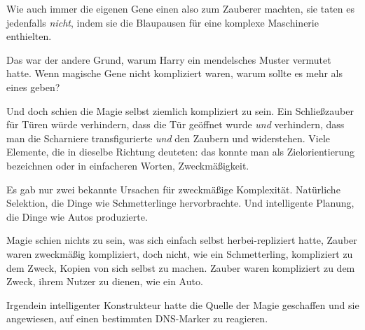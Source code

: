 Wie auch immer die eigenen Gene einen also zum Zauberer machten, sie taten es jedenfalls \emph{nicht}, indem sie die Blaupausen für eine komplexe Maschinerie enthielten.

Das war der andere Grund, warum Harry ein mendelsches Muster vermutet hatte. Wenn magische Gene nicht kompliziert waren, warum sollte es mehr als eines geben?

Und doch schien die Magie selbst ziemlich kompliziert zu sein. Ein Schließzauber für Türen würde verhindern, dass die Tür geöffnet wurde \emph{und} verhindern, dass man die Scharniere transfigurierte \emph{und} den Zaubern  und  widerstehen. Viele Elemente, die in dieselbe Richtung deuteten: das konnte man als Zielorientierung bezeichnen oder in einfacheren Worten, Zweckmäßigkeit.

Es gab nur zwei bekannte Ursachen für zweckmäßige Komplexität. Natürliche Selektion, die Dinge wie Schmetterlinge hervorbrachte. Und intelligente Planung, die Dinge wie Autos produzierte.

Magie schien nichts zu sein, was sich einfach selbst herbei-repliziert hatte, Zauber waren zweckmäßig kompliziert, doch nicht, wie ein Schmetterling, kompliziert zu dem Zweck, Kopien von sich selbst zu machen. Zauber waren kompliziert zu dem Zweck, ihrem Nutzer zu dienen, wie ein Auto.

Irgendein intelligenter Konstrukteur hatte die Quelle der Magie geschaffen und sie angewiesen, auf einen bestimmten DNS-Marker zu reagieren.

